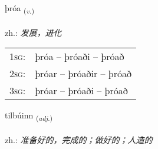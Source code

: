 \documentclass[frontgrid, backgrid]{flacards}\usepackage[]{graphicx}\usepackage[]{xcolor}
\begin{document}
\renewcommand{\blhead}{\vskip5pt {\small\bfseries\footnotesize Sagnorð | 动词 }}
\renewcommand{\bcfoot}{\vskip5pt \hspace{2pt}{\small\bfseries\footnotesize 1K}}


{þróa \small{\textsubscript{(\textit{v.})}} \\[1ex] %
\textphonetic{[θrouːa]} \\
zh.: \emph{发展，进化} \\  [2ex]
\renewcommand*{\arraystretch}{0.8}
\begin{tabular}{p{1cm}l}
\textsc{1sg}: & þróa -- þróaði -- þróað \\ 
\textsc{2sg}: & þróar -- þróaðir -- þróað \\ 
\textsc{3sg}: & þróar -- þróaði -- þróað \\ 
\end{tabular}
}

\renewcommand{\flhead}{\vskip5pt \fboxsep=0pt {\small\bfseries\footnotesize Lýsingarorð | 形容词}}
\renewcommand{\fcfoot}{\vskip5pt \fboxsep=0pt \hspace{2pt}{\small\bfseries\footnotesize 1K}}

\renewcommand{\blhead}{\vskip5pt {\small\bfseries\footnotesize Lýsingarorð | 形容词 }}
\renewcommand{\bcfoot}{\vskip5pt \hspace{2pt}{\small\bfseries\footnotesize 1K}}


{tilbúinn \small{\textsubscript{(\textit{adj.})}} \\[1ex] %
\textphonetic{[tʰɪlpuɪn]} \\
zh.: \emph{准备好的，完成的；做好的；人造的} \\  [2ex]
\renewcommand*{\arraystretch}{0.8}
}
\end{document}
